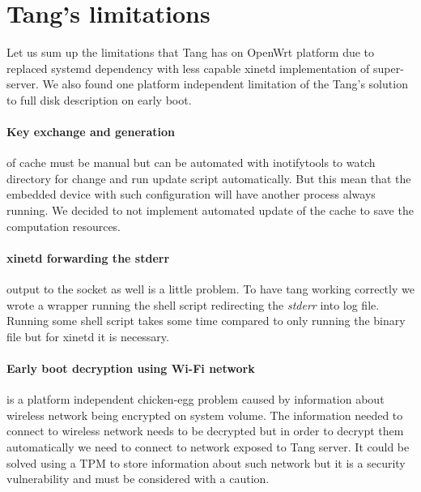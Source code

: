 \section{Tang's limitations}\label{limitations}

Let us sum up the limitations that Tang has on OpenWrt platform due to replaced systemd dependency with less capable xinetd implementation of super-server.
We also found one platform independent limitation of the Tang's solution to full disk description on early boot.

\paragraph{Key exchange and generation} of cache must be manual but  can be automated with inotifytools to watch directory for change and run update script automatically.
But this mean that the embedded device with such configuration will have another process always running.
We decided to not implement automated update of the cache to save the computation resources.

\paragraph{xinetd forwarding the stderr} output to the socket as well is a little problem.
To have tang working correctly we wrote a wrapper running the shell script redirecting the {\it stderr} into log file.
Running some shell script takes some time compared to only running the binary file but for xinetd it is necessary.

\paragraph{Early boot decryption using Wi-Fi network} is a platform independent chicken-egg problem caused by information about wireless network being encrypted on system volume.
The information needed to connect to wireless network needs to be decrypted but in order to decrypt them automatically we need to connect to network exposed to Tang server.
It could be solved using a TPM to store information about such network but it is a security vulnerability and must be considered with a caution.
